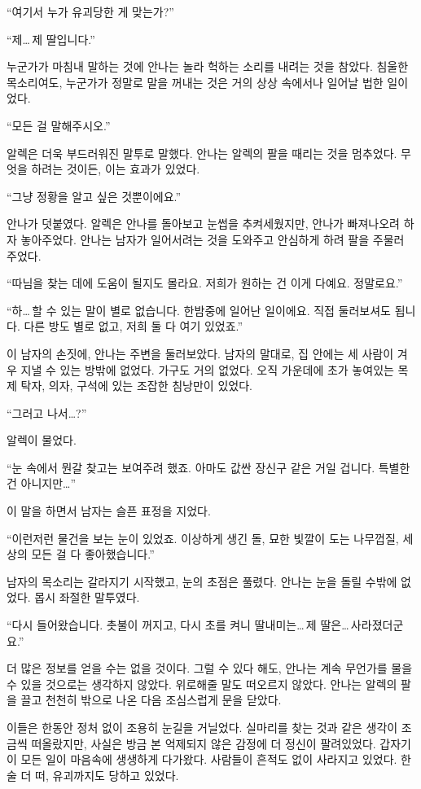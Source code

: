 ``여기서 누가 유괴당한 게 맞는가?''

``제\ldots\,제 딸입니다.''

누군가가 마침내 말하는 것에 안나는 놀라 헉하는 소리를 내려는 것을 참았다. 침울한 목소리여도, 누군가가 정말로 말을 꺼내는 것은 거의 상상 속에서나 일어날 법한 일이었다.

``모든 걸 말해주시오.''

알렉은 더욱 부드러워진 말투로 말했다. 안나는 알렉의 팔을 때리는 것을 멈추었다. 무엇을 하려는 것이든, 이는 효과가 있었다.

``그냥 정황을 알고 싶은 것뿐이에요.''

안나가 덧붙였다. 알렉은 안나를 돌아보고 눈썹을 추켜세웠지만, 안나가 빠져나오려 하자 놓아주었다. 안나는 남자가 일어서려는 것을 도와주고 안심하게 하려 팔을 주물러 주었다.

``따님을 찾는 데에 도움이 될지도 몰라요. 저희가 원하는 건 이게 다예요. 정말로요.''

``하\ldots\,할 수 있는 말이 별로 없습니다. 한밤중에 일어난 일이에요. 직접 둘러보셔도 됩니다. 다른 방도 별로 없고, 저희 둘 다 여기 있었죠.''

이 남자의 손짓에, 안나는 주변을 둘러보았다. 남자의 말대로, 집 안에는 세 사람이 겨우 지낼 수 있는 방밖에 없었다. 가구도 거의 없었다. 오직 가운데에 초가 놓여있는 목제 탁자, 의자, 구석에 있는 조잡한 침낭만이 있었다.

``그러고 나서\ldots?''

알렉이 물었다.

``눈 속에서 뭔갈 찾고는 보여주려 했죠. 아마도 값싼 장신구 같은 거일 겁니다. 특별한 건 아니지만\ldots''

이 말을 하면서 남자는 슬픈 표정을 지었다.

``이런저런 물건을 보는 눈이 있었죠. 이상하게 생긴 돌, 묘한 빛깔이 도는 나무껍질, 세상의 모든 걸 다 좋아했습니다.''

남자의 목소리는 갈라지기 시작했고, 눈의 초점은 풀렸다. 안나는 눈을 돌릴 수밖에 없었다. 몹시 좌절한 말투였다.

``다시 들어왔습니다. 촛불이 꺼지고, 다시 초를 켜니 딸내미는\ldots\,제 딸은\ldots\,사라졌더군요.''

더 많은 정보를 얻을 수는 없을 것이다. 그럴 수 있다 해도, 안나는 계속 무언가를 물을 수 있을 것으로는 생각하지 않았다. 위로해줄 말도 떠오르지 않았다. 안나는 알렉의 팔을 끌고 천천히 밖으로 나온 다음 조심스럽게 문을 닫았다.

이들은 한동안 정처 없이 조용히 눈길을 거닐었다. 실마리를 찾는 것과 같은 생각이 조금씩 떠올랐지만, 사실은 방금 본 억제되지 않은 감정에 더 정신이 팔려있었다. 갑자기 이 모든 일이 마음속에 생생하게 다가왔다. 사람들이 흔적도 없이 사라지고 있었다. 한술 더 떠, 유괴까지도 당하고 있었다.

